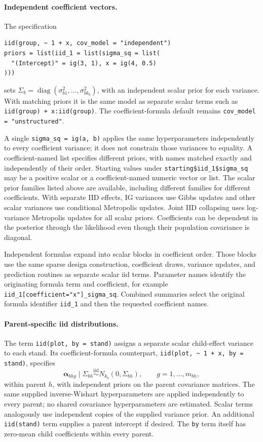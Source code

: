\documentclass[11pt]{article}
\newcommand{\balpha}{\bm{\alpha}}
\begin{document}
\paragraph{Independent coefficient vectors.}
The specification
\begin{verbatim}
iid(group, ~ 1 + x, cov_model = "independent")
priors = list(iid_1 = list(sigma_sq = list(
  "(Intercept)" = ig(3, 1), x = ig(4, 0.5)
)))
\end{verbatim}
sets $\Sigma_b=\operatorname{diag}(\sigma^2_{b1},\ldots,\sigma^2_{bk_b})$, with an independent scalar prior for each variance. With matching priors it is the same model as separate scalar terms such as \texttt{iid(group) + x:iid(group)}. The coefficient-formula default remains \texttt{cov\_model = "unstructured"}.

A single \texttt{sigma\_sq = ig(a, b)} applies the same hyperparameters independently to every coefficient variance; it does not constrain those variances to equality. A coefficient-named list specifies different priors, with names matched exactly and independently of their order. Starting values under \texttt{starting\$iid\_1\$sigma\_sq} may be a positive scalar or a coefficient-named numeric vector or list. The scalar prior families listed above are available, including different families for different coefficients. With separate IID effects, IG variances use Gibbs updates and other scalar variances use conditional Metropolis updates. Joint IID collapsing uses log-variance Metropolis updates for all scalar priors. Coefficients can be dependent in the posterior through the likelihood even though their population covariance is diagonal.

Independent formulas expand into scalar blocks in coefficient order. Those blocks use the same sparse design construction, coefficient draws, variance updates, and prediction routines as separate scalar iid terms. Parameter names identify the originating formula term and coefficient, for example \texttt{iid\_1[coefficient="x"]\_sigma\_sq}. Combined summaries select the original formula identifier \texttt{iid\_1} and then the requested coefficient names.

\paragraph{Parent-specific iid distributions.}
The term \texttt{iid(plot, by = stand)} assigns a separate scalar child-effect variance to each stand. Its coefficient-formula counterpart, \texttt{iid(plot, \textasciitilde{} 1 + x, by = stand)}, specifies
\begin{equation}
 \balpha_{bhg}\mid\Sigma_{bh}\stackrel{\mathrm{iid}}{\sim}
 N_{k_b}(0,\Sigma_{bh}),\qquad g=1,\ldots,m_{bh},
\end{equation}
within parent $h$, with independent priors on the parent covariance matrices. The same supplied inverse-Wishart hyperparameters are applied independently to every parent; no shared covariance hyperparameters are estimated. Scalar terms analogously use independent copies of the supplied variance prior. An additional \texttt{iid(stand)} term supplies a parent intercept if desired. The \texttt{by} term itself has zero-mean child coefficients within every parent.
\end{document}
